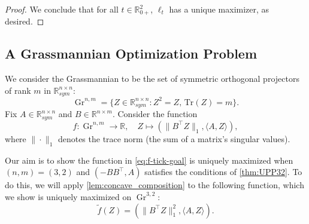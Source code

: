 \documentclass{article}
\numberwithin{equation}{section}
\newcommand{\tr}{\mathrm{Tr}}
\newcommand{\R}{\mathbb{R}}
\DeclareMathOperator{\Gr}{Gr}
\begin{document}
\begin{proof}
    We conclude that for all $t \in \R^2_{0+}$, $\ell_t$ has a unique maximizer, as desired.
\end{proof}

\subsection{A Grassmannian Optimization Problem}
We consider the Grassmannian to be the set of symmetric orthogonal projectors of rank $m$ in $\R^{n\times n}_{sym}$:
\[
    \Gr^{n,m} = \{Z \in \R^{n \times n}_{sym} : Z^2 = Z,\, \tr(Z) = m\}.
\]
Fix $A \in \R^{n\times n}_{sym}$ and $B \in \R^{n \times m}$.
Consider the function
\begin{equation}\label{eq:f-tick-goal}
\hat{f}:\Gr^{n,m}\to\mathbb{R},\quad
    Z \mapsto (\|B^{\intercal}Z\|_1, \langle A, Z\rangle),
\end{equation}
where $\|\cdot\|_1$ 
denotes the trace norm (the sum of a matrix's singular values).

Our aim is to show 
the function in \eqref{eq:f-tick-goal}
is uniquely maximized when $(n,m) = (3,2)$ and $(-BB^{\intercal}, A)$ satisfies the conditions of \cref{thm:UPP32}.
To do this, we will apply \cref{lem:concave_composition} to the following function, which we show is uniquely maximized on $\Gr^{3,2}$:
\begin{equation}
\label{eq:def_tilde_f}
    \tilde{f}(Z) = (\|B^{\intercal}Z\|_1^2, \langle A, Z\rangle).
\end{equation}
\end{document}
